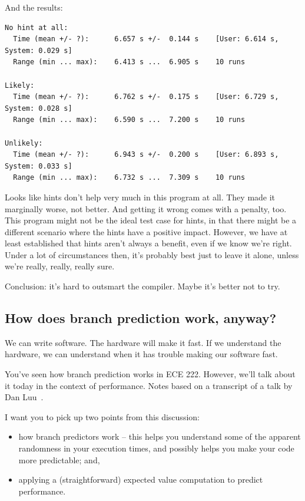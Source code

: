 And the results:
\begin{verbatim}
No hint at all:
  Time (mean +/- ?):      6.657 s +/-  0.144 s    [User: 6.614 s, System: 0.029 s]
  Range (min ... max):    6.413 s ...  6.905 s    10 runs
  
Likely:
  Time (mean +/- ?):      6.762 s +/-  0.175 s    [User: 6.729 s, System: 0.028 s]
  Range (min ... max):    6.590 s ...  7.200 s    10 runs

Unlikely:
  Time (mean +/- ?):      6.943 s +/-  0.200 s    [User: 6.893 s, System: 0.033 s]
  Range (min ... max):    6.732 s ...  7.309 s    10 runs
\end{verbatim}

Looks like hints don't help very much in this program at all. They made it marginally worse, not better. And getting it wrong comes with a penalty, too. This program might not be the ideal test case for hints, in that there might be a different scenario where the hints have a positive impact. However, we have at least established that hints aren't always a benefit, even if we know we're right. Under a lot of circumstances then, it's probably best just to leave it alone, unless we're really, really, really sure. 

Conclusion: it's hard to outsmart the compiler. Maybe it's better not to try.

\subsection*{How does branch prediction work, anyway?}
We can write software. The hardware will make it fast. If we understand the hardware, we can understand when it has trouble making our software fast.

You've seen how branch prediction works in ECE 222. However, we'll talk about it today in the context of performance. Notes based on a transcript of a talk by Dan Luu~\cite{branchprediction}.

I want you to pick up two points from this discussion:
\vspace*{-1em}
\begin{itemize}[noitemsep]
\item how branch predictors work -- this helps you understand some of the apparent randomness in your
execution times, and possibly helps you make your code more predictable; and,
\item applying a (straightforward) expected value computation to predict performance.
\end{itemize}

